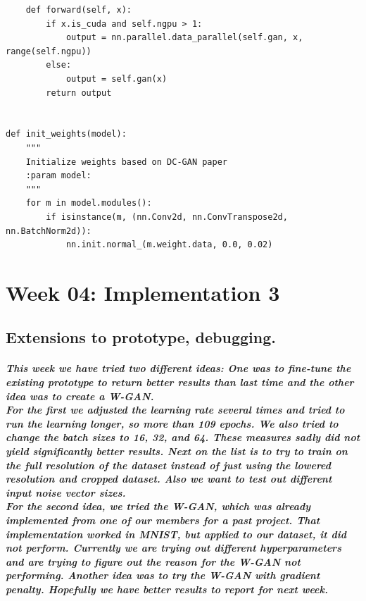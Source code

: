 \begin{lstlisting}
    def forward(self, x):
        if x.is_cuda and self.ngpu > 1:
            output = nn.parallel.data_parallel(self.gan, x, range(self.ngpu))
        else:
            output = self.gan(x)
        return output


def init_weights(model):
    """
    Initialize weights based on DC-GAN paper
    :param model:
    """
    for m in model.modules():
        if isinstance(m, (nn.Conv2d, nn.ConvTranspose2d, nn.BatchNorm2d)):
            nn.init.normal_(m.weight.data, 0.0, 0.02)
\end{lstlisting}

\newpage
\chapter{Week 04: Implementation 3}
\section{Extensions to prototype, debugging.}
\paragraph{
 This week we have tried two different ideas: One was to fine-tune the existing prototype to return better results than last time and the other idea was to create a W-GAN. \\
 For the first we adjusted the learning rate several times and tried to run the learning longer, so more than 109 epochs. We also tried to change the batch sizes to 16, 32, and 64. These measures sadly did not yield significantly better results. Next on the list is to try to train on the full resolution of the dataset instead of just using the lowered resolution and cropped dataset. Also we want to test out different input noise vector sizes.\\ 
 For the second idea, we tried the W-GAN, which was already implemented from one of our members for a past project. That implementation worked in MNIST, but applied to our dataset, it did not perform. Currently we are trying out different hyperparameters and are trying to figure out the reason for the W-GAN not performing. Another idea was to try the W-GAN with gradient penalty. Hopefully we have better results to report for next week.
}
